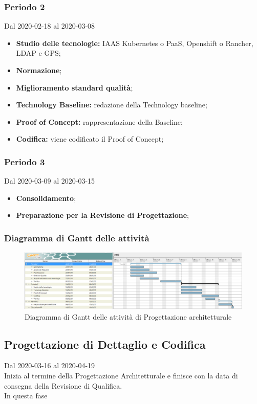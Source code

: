 \subsubsection{Periodo 2} 
Dal 2020-02-18 al 2020-03-08
\begin{itemize}
	\item \textbf{Studio delle tecnologie:} IAAS Kubernetes o PaaS, Openshift o Rancher, LDAP e GPS;
	\item \textbf{Normazione};
	\item \textbf{Miglioramento standard qualità};
	\item \textbf{Technology Baseline:} redazione della Technology baseline;
	\item \textbf{Proof of Concept:} rappresentazione della Baseline;
	\item \textbf{Codifica:} viene codificato il Proof of Concept;
\end{itemize}
\subsubsection{Periodo 3} 
Dal 2020-03-09 al 2020-03-15
\begin{itemize}
	\item \textbf{Consolidamento};
	\item \textbf{Preparazione per la Revisione di Progettazione};
\end{itemize}
\subsubsection{Diagramma di Gantt delle attività}
\begin{figure}[h]
	\includegraphics[scale=0.45]{sezioni/DiagrammiGantt/ProgettazioneArchitetturale.png}
	\caption{Diagramma di Gantt delle attività di Progettazione architetturale}
\end{figure}

\subsection{Progettazione di Dettaglio e Codifica}
Dal 2020-03-16 al 2020-04-19\\
Inizia al termine della Progettazione Architetturale e finisce con la data di consegna della Revisione di Qualifica.\\
In questa fase 


